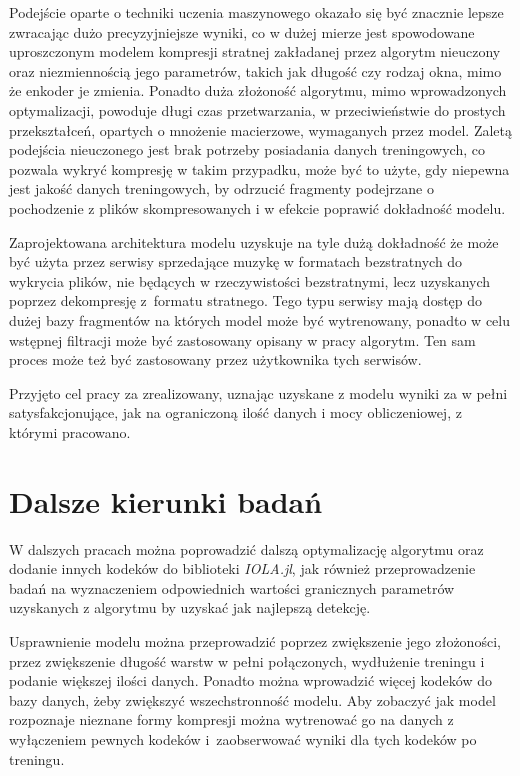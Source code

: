\documentclass[pl,12pt]{aghdpl}
\let\Oldsection\section%
\renewcommand{\section}{\FloatBarrier\Oldsection}
\begin{document}
Podejście oparte o techniki uczenia maszynowego okazało się być znacznie lepsze
zwracając dużo precyzyjniejsze wyniki, co w dużej mierze jest spowodowane
uproszczonym modelem kompresji stratnej zakładanej przez algorytm nieuczony oraz
niezmiennością jego parametrów, takich jak długość czy rodzaj okna, mimo że
enkoder je zmienia. Ponadto duża złożoność algorytmu, mimo wprowadzonych
optymalizacji, powoduje długi czas przetwarzania, w przeciwieństwie do prostych
przekształceń, opartych o mnożenie macierzowe, wymaganych przez model. Zaletą
podejścia nieuczonego jest brak potrzeby posiadania danych treningowych, co
pozwala wykryć kompresję w takim przypadku, może być to użyte, gdy niepewna
jest jakość danych treningowych, by odrzucić fragmenty podejrzane o pochodzenie
z plików skompresowanych i w efekcie poprawić dokładność modelu.

Zaprojektowana architektura modelu uzyskuje na tyle dużą dokładność że może być
użyta przez serwisy sprzedające muzykę w formatach bezstratnych do wykrycia
plików, nie będących w rzeczywistości bezstratnymi, lecz uzyskanych poprzez
dekompresję z~formatu stratnego. Tego typu serwisy mają dostęp do dużej bazy
fragmentów na których model może być wytrenowany, ponadto w celu wstępnej
filtracji może być zastosowany opisany w pracy algorytm. Ten sam proces może
też być zastosowany przez użytkownika tych serwisów.

Przyjęto cel pracy za zrealizowany, uznając uzyskane z modelu wyniki za w pełni
satysfakcjonujące, jak na ograniczoną ilość danych i mocy obliczeniowej, z
którymi pracowano.

\section{Dalsze kierunki badań}

W dalszych pracach można poprowadzić dalszą optymalizację algorytmu oraz
dodanie innych kodeków do biblioteki \textit{IOLA.jl}, jak również
przeprowadzenie badań na wyznaczeniem odpowiednich wartości granicznych
parametrów uzyskanych z algorytmu by uzyskać jak najlepszą detekcję.

Usprawnienie modelu można przeprowadzić poprzez zwiększenie jego złożoności,
przez zwiększenie długość warstw w pełni połączonych, wydłużenie treningu i
podanie większej ilości danych. Ponadto można wprowadzić więcej kodeków do bazy
danych, żeby zwiększyć wszechstronność modelu. Aby zobaczyć jak model
rozpoznaje nieznane formy kompresji można wytrenować go na danych z wyłączeniem
pewnych kodeków i~zaobserwować wyniki dla tych kodeków po treningu.


\cleardoublepage{}
\printbibliography{}
\end{document}
